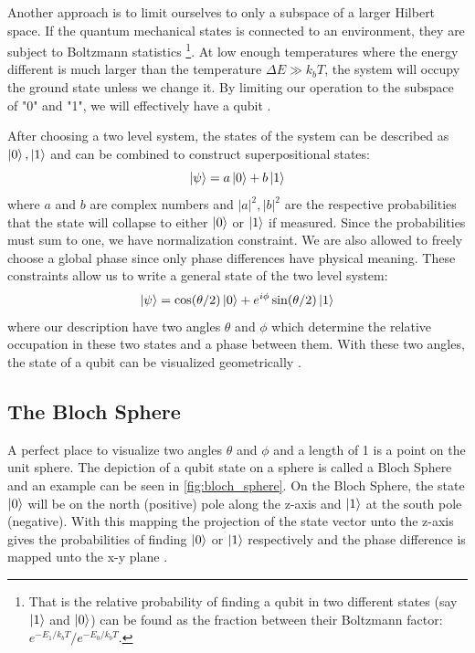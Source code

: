 Another approach is to limit ourselves to only a subspace of a larger Hilbert space. If the quantum mechanical states is connected to an environment, they are subject to Boltzmann statistics \footnote{That is the relative probability of finding a qubit in two different states (say $\ket{1}$ and $\ket{0}$) can be found as the fraction between their Boltzmann factor: $e^{-E_1 / k_b  T} / e^{- E_0 / k_b  T}$.}. At low enough temperatures where the energy different is much larger than the temperature $\Delta E \gg k_b T$, the system will occupy the ground state unless we change it. By limiting our operation to the subspace of "0" and "1", we will effectively have a qubit \cite{boltzmann}. 

After choosing a two level system, the states of the system can be described as $\ket{0}, \ket{1}$ and can be combined to construct superpositional states:
\begin{equation}
    \ket{\psi} = a \ket{0} + b \ket{1}
\end{equation}
where $a$ and $b$ are complex numbers and $|a|^2, |b|^2$ are the respective probabilities that the state will collapse to either $\ket{0}$ or $\ket{1}$ if measured. Since the probabilities must sum to one, we have normalization constraint. We are also allowed to freely choose a global phase since only phase differences have physical meaning\cite{}. These constraints allow us to write a general state of the two level system:
\begin{equation}\label{eq:general_2_state}
    \ket{\psi} = \cos (\theta / 2) \ket{0} + e^{i\phi}\sin(\theta / 2)\ket{1}
\end{equation}
where our description have two angles $\theta$ and $\phi$ which determine the relative occupation in these two states and a phase between them. With these two angles, the state of a qubit can be visualized geometrically \cite{krantz_quantum_2019}.

\subsection{The Bloch Sphere}
A perfect place to visualize two angles $\theta$ and $\phi$ and a length of 1 is a point on the unit sphere. The depiction of a qubit state on a sphere is called a Bloch Sphere and an example can be seen in \ref{fig:bloch_sphere}. On the Bloch Sphere, the state $\ket{0}$ will be on the north (positive) pole along the z-axis and $\ket{1}$ at the south pole (negative). With this mapping the projection of the state vector unto the z-axis gives the probabilities of finding $\ket{0}$ or $\ket{1}$ respectively and the phase difference is mapped unto the x-y plane  \cite{krantz_week_2019}.

